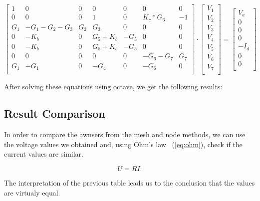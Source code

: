 \[
\begin{bmatrix}
1 & 0 & 0 & 0 & 0 & 0 & 0\\
0 & 0 & 0 & 1 & 0 & K_c * G_6 & -1\\
G_1 & -G_1-G_2 - G_3 & G_2 & G_3 & 0 & 0 & 0\\
0 & -K_b & 0 & G_5 + K_b & -G_5 & 0 & 0\\
0 & -K_b & 0 & G_5 + K_b & -G_5 & 0 & 0\\
0 & 0 & 0 & 0 & 0 & -G_6-G_7 & G_7\\
G_1 & -G_1 & 0 & -G_4 & 0 & -G_6 & 0\\
\end{bmatrix}
\cdot
\begin{bmatrix}
V_1\\
V_2\\
V_3\\
V_4\\
V_5\\
V_6\\
V_7\\
\end{bmatrix}
=
\begin{bmatrix}
V_a\\
0\\
0\\
0\\
-I_d\\
0\\
0\\
\end{bmatrix}
\]

\vspace{0.5cm}

After solving these equations using octave, we get 
the following results:

\vspace{0.5cm}


\vspace{1.0cm}

\subsection{Result Comparison }

In order to compare the awnsers from the mesh and node methods, we
can use the voltage values we obtained and, using Ohm's law ~(\ref{eq:ohm}), check if the
current values are similar.

\vspace{0.5cm}

\begin{equation}
  U = RI.
  \label{eq:ohm}
\end{equation}

\vspace{0.5cm}


\vspace{0.5cm}

The interpretation of the previous table leads us to the conclusion that the
values are virtualy equal.

\vspace{0.5cm}
